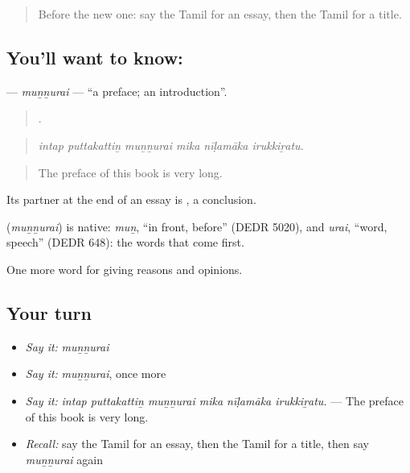 \label{lesson:TA-C365-munnurai}



\begin{quote}
Before the new one: say the Tamil for an essay, then the Tamil for a title.
\end{quote}

\subsection*{You'll want to know: }
\textbf{} — \emph{muṉṉurai} — \textquotedblleft{}a preface; an introduction\textquotedblright{}.

\begin{quote}
     .
\end{quote}

\begin{quote}
\emph{intap puttakattiṉ muṉṉurai mika nīḷamāka irukkiṟatu.}
\end{quote}

\begin{quote}
The preface of this book is very long.
\end{quote}

Its partner at the end of an essay is , a conclusion.

\begin{cousinweb}
\textbf{} (\emph{muṉṉurai}) is native: \emph{muṉ}, \textquotedblleft{}in front, before\textquotedblright{} (DEDR 5020), and \emph{urai}, \textquotedblleft{}word, speech\textquotedblright{} (DEDR 648): the words that come first.
\end{cousinweb}

\begin{grammarlens}[title={What you've built}]
One more word for giving reasons and opinions.
\end{grammarlens}

\subsection*{Your turn}
\begin{itemize}
\raggedright
  \item \emph{Say it:} \emph{muṉṉurai}
  \item \emph{Say it:} \emph{muṉṉurai}, once more
  \item \emph{Say it:} \emph{intap puttakattiṉ muṉṉurai mika nīḷamāka irukkiṟatu.} — The preface of this book is very long.
  \item \emph{Recall:} say the Tamil for an essay, then the Tamil for a title, then say \emph{muṉṉurai} again
\end{itemize}

